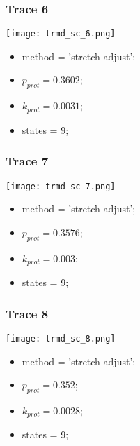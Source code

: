 \subsubsection{Trace 6}
\begin{minipage}[c]{0.7\textwidth}
    \texttt{[image: trmd\_sc\_6.png]}
\end{minipage}
\hfill
\begin{minipage}[c]{0.45\textwidth}
    \begin{itemize}
        \item method = 'stretch-adjust';
        \item $p_{prot}=0.3602$;
        \item $k_{prot}=0.0031$;
        \item states = 9;
    \end{itemize}
\end{minipage}

\subsubsection{Trace 7}
\begin{minipage}[c]{0.7\textwidth}
    \texttt{[image: trmd\_sc\_7.png]}
\end{minipage}
\hfill
\begin{minipage}[c]{0.45\textwidth}
    \begin{itemize}
        \item method = 'stretch-adjust';
        \item $p_{prot}=0.3576$;
        \item $k_{prot}=0.003$;
        \item states = 9;
    \end{itemize}
\end{minipage}

\subsubsection{Trace 8}
\begin{minipage}[c]{0.7\textwidth}
    \texttt{[image: trmd\_sc\_8.png]}
\end{minipage}
\hfill
\begin{minipage}[c]{0.45\textwidth}
    \begin{itemize}
        \item method = 'stretch-adjust';
        \item $p_{prot}=0.352$;
        \item $k_{prot}=0.0028$;
        \item states = 9;
    \end{itemize}
\end{minipage}

